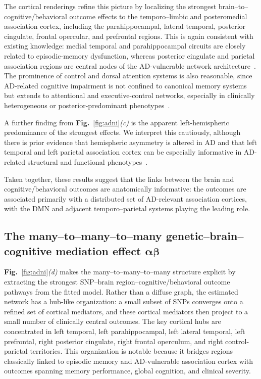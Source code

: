 \documentclass[
  12pt]{article}
\begin{document}
The cortical renderings refine this picture by localizing the strongest brain--to--cognitive/behavioral outcome effects to the temporo--limbic and posteromedial association cortex, including the parahippocampal, lateral temporal, posterior cingulate, frontal opercular, and prefrontal regions.
This is again consistent with existing knowledge: medial temporal and parahippocampal circuits are closely related to episodic-memory dysfunction, whereas posterior cingulate and parietal association regions are central nodes of the AD-vulnerable network architecture~\citep{berron2020medial,lee2020posterior,tang2024multimodal}.
The prominence of control and dorsal attention systems is also reasonable, since AD-related cognitive impairment is not confined to canonical memory systems but extends to attentional and executive-control networks, especially in clinically heterogeneous or posterior-predominant phenotypes~\citep{katsumi2024greater,katsumi2023association}.

A further finding from \textbf{Fig.}~\ref{fig:adni}\textit{(c)} is the apparent left-hemispheric predominance of the strongest effects.
We interpret this cautiously, although there is prior evidence that hemispheric asymmetry is altered in AD and that left temporal and left parietal association cortex can be especially informative in AD-related structural and functional phenotypes~\citep{mizrak2024investigation,park2017improved}.

Taken together, these results suggest that the links between the brain and cognitive/behavioral outcomes are anatomically informative: the outcomes are associated primarily with a distributed set of AD-relevant association cortices, with the DMN and adjacent temporo--parietal systems playing the leading role.

\subsection{The many--to--many--to--many genetic--brain--cognitive mediation effect \texorpdfstring{$\bm{\alpha}\bm{\beta}$}{alpha beta}}

\textbf{Fig.}~\ref{fig:adni}\textit{(d)} makes the many--to--many--to--many structure explicit by extracting the strongest SNP--brain region--cognitive/behavioral outcome pathways from the fitted model.
Rather than a diffuse graph, the estimated network has a hub-like organization: a small subset of SNPs converges onto a refined set of cortical mediators, and these cortical mediators then project to a small number of clinically central outcomes.
The key cortical hubs are concentrated in left temporal, left parahippocampal, left lateral temporal, left prefrontal, right posterior cingulate, right frontal operculum, and right control-parietal territories.
This organization is notable because it bridges regions classically linked to episodic memory and AD-vulnerable association cortex with outcomes spanning memory performance, global cognition, and clinical severity.
\end{document}
